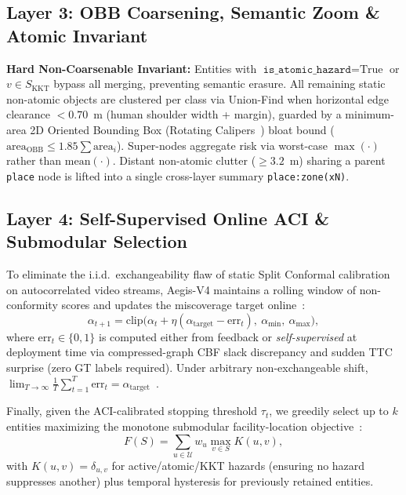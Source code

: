 \documentclass[journal]{IEEEtran}
\begin{document}
\subsection{Layer 3: OBB Coarsening, Semantic Zoom \& Atomic Invariant}
\textbf{Hard Non-Coarsenable Invariant:} Entities with $\texttt{is\_atomic\_hazard} = \text{True}$ or $v \in S_{\text{KKT}}$ bypass all merging, preventing semantic erasure. All remaining static non-atomic objects are clustered per class via Union-Find when horizontal edge clearance $< 0.70$~m (human shoulder width + margin), guarded by a minimum-area 2D Oriented Bounding Box (Rotating Calipers~\cite{freeman1975obb}) bloat bound ($\text{area}_{\text{OBB}} \le 1.85 \sum \text{area}_i$). Super-nodes aggregate risk via worst-case $\max(\cdot)$ rather than $\text{mean}(\cdot)$. Distant non-atomic clutter ($\ge 3.2$~m) sharing a parent \texttt{place} node is lifted into a single cross-layer summary \texttt{place:zone(xN)}.

\subsection{Layer 4: Self-Supervised Online ACI \& Submodular Selection}
To eliminate the i.i.d.\ exchangeability flaw of static Split Conformal calibration on autocorrelated video streams, Aegis-V4 maintains a rolling window of non-conformity scores and updates the miscoverage target online~\cite{gibbs2021aci}:
\begin{equation}
    \alpha_{t+1} = \mathrm{clip}\big(\alpha_t + \eta (\alpha_{\text{target}} - \text{err}_t),\ \alpha_{\min},\ \alpha_{\max}\big),
\end{equation}
where $\text{err}_t \in \{0, 1\}$ is computed either from feedback or \emph{self-supervised} at deployment time via compressed-graph CBF slack discrepancy and sudden TTC surprise (zero GT labels required). Under arbitrary non-exchangeable shift, $\lim_{T\to\infty} \frac{1}{T}\sum_{t=1}^T \text{err}_t = \alpha_{\text{target}}$~\cite{gibbs2021aci}.

Finally, given the ACI-calibrated stopping threshold $\tau_t$, we greedily select up to $k$ entities maximizing the monotone submodular facility-location objective~\cite{nemhauser1978submodular}:
\begin{equation}
    F(S) = \sum_{u \in \mathcal{U}} w_u \max_{v \in S} K(u, v),
\end{equation}
with $K(u, v) = \delta_{u,v}$ for active/atomic/KKT hazards (ensuring no hazard suppresses another) plus temporal hysteresis for previously retained entities.
\end{document}

